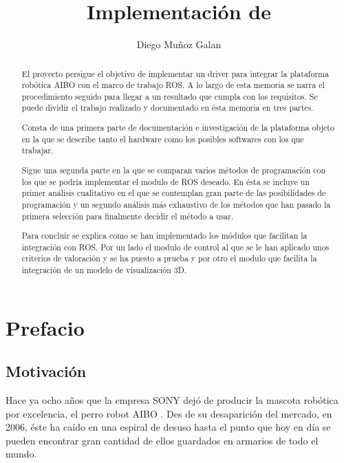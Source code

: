 \documentclass[12pt,a4paper,final,twoside]{article}
\title{Implementación de }
\author{Diego Muñoz Galan}
\begin{document}
\maketitle
\thispagestyle{empty}

\newpage
\paragraph{}
\thispagestyle{empty}
\cleardoublepage

\setcounter{page}{1}

\begin{abstract}
El proyecto persigue el objetivo de implementar un driver para integrar la plataforma robótica AIBO con el marco de trabajo ROS. A lo largo de esta memoria se narra el procedimiento seguido para llegar a un resultado que cumpla con los requisitos. 
Se puede dividir el trabajo realizado y documentado en ésta memoria en tres partes.

Consta de una primera parte de documentación e investigación de la plataforma objeto en la que se describe tanto el hardware como los posibles softwares con los que trabajar.

Sigue una segunda parte en la que se comparan varios métodos de programación con los que se podría implementar el modulo de ROS deseado. En ésta se incluye un primer análisis cualitativo en el que se contemplan gran parte de las posibilidades de programación y un segundo análisis más exhaustivo de los métodos que han pasado la primera selección para finalmente decidir el método a usar.

Para concluir se explica como se han implementado los módulos que facilitan la integración con ROS. Por un lado el modulo de control al que se le han aplicado unos criterios de valoración y se ha puesto a prueba y por otro el modulo que facilita la integración de un modelo de visualización 3D.





\end{abstract}

\newpage
\cleardoublepage

\tableofcontents
\newpage
\listoffigures
\newpage
\listoftables
\newpage


\section{Prefacio}
\subsection{Motivación}
Hace ya ocho años que la empresa SONY dejó de producir la mascota robótica por excelencia, el perro robot AIBO \cite{aibo}. Des de su desaparición del mercado, en 2006, éste ha caído en una espiral de desuso hasta el punto que hoy en día se pueden encontrar gran cantidad de ellos guardados en armarios de todo el mundo.
\end{document}
